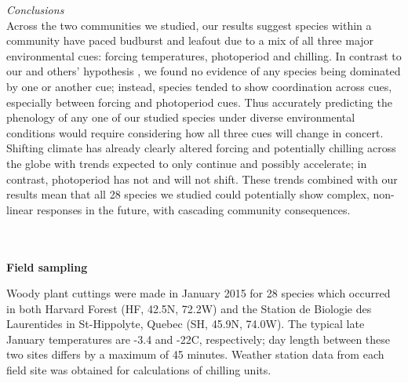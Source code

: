 \documentclass[11pt]{article}
\begin{document}
\noindent \emph{Conclusions}\\
Across the two communities we studied, our results suggest species within a community have paced budburst and leafout due to a mix of all three major environmental cues: forcing temperatures, photoperiod and chilling. In contrast to our and others' hypothesis \citep{Korner:2010}, we found no evidence of any species being dominated by one or another cue; instead, species tended to show coordination across cues, especially between forcing and photoperiod cues.  Thus accurately predicting the phenology of any one of our studied species under diverse environmental conditions would require considering how all three cues will change in concert. Shifting climate has already clearly altered forcing and potentially chilling across the globe \citep{ipcc2013,IPCC:2014sm} with trends expected to only continue and possibly accelerate; in contrast, photoperiod has not and will not shift. These trends combined with our results mean that all 28 species we studied could potentially show complex, non-linear responses in the future, with cascading community consequences. %




\vspace{2ex}\\
\vspace{2ex}\\
\noindent \textbf{Field sampling}

Woody plant cuttings were made in January 2015 for 28 species which occurred in both Harvard Forest (HF, 42.5\degree N, 72.2\degree W) and the Station de Biologie des Laurentides in St-Hippolyte, Quebec (SH, 45.9\degree N, 74.0\degree W). The typical late January temperatures are -3.4 and -22\degree C, respectively; day length between these two sites differs by a maximum of 45 minutes. Weather station data from each field site was obtained for calculations of chilling units. 
\end{document}
